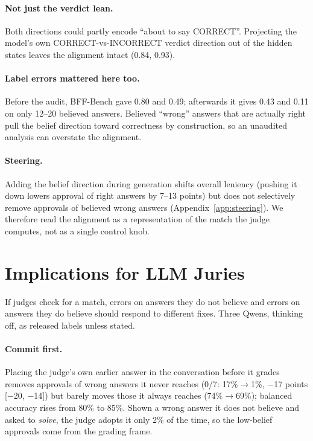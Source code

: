 \documentclass[11pt]{article}
\begin{document}
\paragraph{Not just the verdict lean.}
Both directions could partly encode ``about to say CORRECT''. Projecting the model's own CORRECT-vs-INCORRECT verdict
direction out of the hidden states leaves the alignment intact (0.84, 0.93).

\paragraph{Label errors mattered here too.}
Before the audit, BFF-Bench gave 0.80 and 0.49; afterwards it gives 0.43 and 0.11 on only 12--20 believed answers.
Believed ``wrong'' answers that are actually right pull the belief direction toward correctness by construction, so
an unaudited analysis can overstate the alignment.

\paragraph{Steering.}
Adding the belief direction during generation shifts overall leniency (pushing it down lowers approval of right
answers by 7--13 points) but does not selectively remove approvals of believed wrong answers
(Appendix~\ref{app:steering}). We therefore read the alignment as a representation of the match the judge computes,
not as a single control knob.

\section{Implications for LLM Juries}
\label{sec:juries}

If judges check for a match, errors on answers they do not believe and errors on answers they do believe should
respond to different fixes. Three Qwens, thinking off, as released labels unless stated.

\paragraph{Commit first.}
Placing the judge's own earlier answer in the conversation before it grades removes approvals of wrong answers it
never reaches (0/7: 17\%$\rightarrow$1\%, $-$17 points [$-$20, $-$14]) but barely moves those it always reaches (74\%$\rightarrow$69\%); balanced
accuracy rises from 80\% to 85\%. Shown a wrong answer it does not believe and asked to \emph{solve}, the judge
adopts it only 2\% of the time, so the low-belief approvals come from the grading frame.
\end{document}
